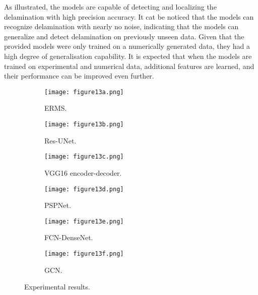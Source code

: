 As illustrated, the models are capable of detecting and localizing the delamination with high precision accuracy.
It cat be noticed that the models can recognize delamination with nearly no noise, indicating that the models can generalize and detect delamination on previously unseen data.
Given that the provided models were only trained on a numerically generated data, they had a high degree of generalisation capability.
It is expected that when the models are trained on experimental and numerical data, additional features are learned, and their performance can be improved even further.
\begin{figure}[h!]
	\centering
	\begin{subfigure}[b]{0.47\textwidth}
		\centering
		\texttt{[image: figure13a.png]}
		\caption{ERMS.} %
		\label{fig:Delamination}	
	\end{subfigure}	
	\hfill
	\begin{subfigure}[b]{0.47\textwidth}
		\centering
		\texttt{[image: figure13b.png]}
		\caption{Res-UNet.} 
		\label{fig:unet_exp_7_}
	\end{subfigure}
	\hfill
	\begin{subfigure}[b]{0.47\textwidth}
		\centering
		\texttt{[image: figure13c.png]}
		\caption{VGG16 encoder-decoder.} 
		\label{fig:vgg16_exp_7_}
	\end{subfigure}
	\hfill
	\begin{subfigure}[b]{0.47\textwidth}
		\centering
		\texttt{[image: figure13d.png]}
		\caption{PSPNet.} 
		\label{fig:pspnet_exp_7_}
	\end{subfigure}
	\hfill
	\begin{subfigure}[b]{0.47\textwidth}
		\centering
		\texttt{[image: figure13e.png]}
		\caption{FCN-DenseNet.} 
		\label{fig:fcn_densenet_exp}
	\end{subfigure}
	\hfill
	\begin{subfigure}[b]{0.47\textwidth}
		\centering
		\texttt{[image: figure13f.png]}
		\caption{GCN.} 
		\label{fig:gcn_exp}
	\end{subfigure}
	\caption{Experimental results.}
	\label{fig:Exp_ERMS_teflon}
\end{figure}
\clearpage
